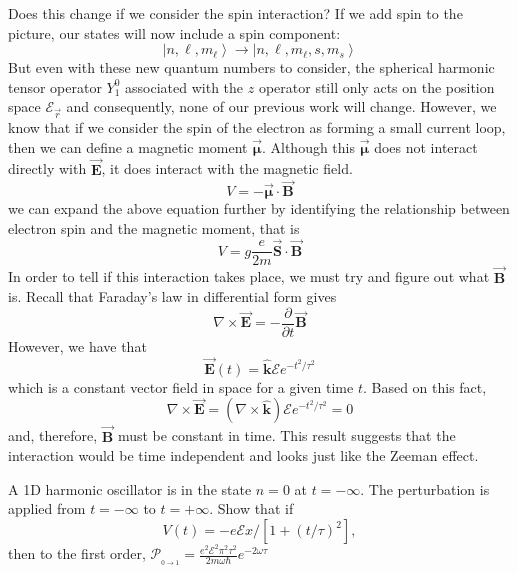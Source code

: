 \documentclass[a4paper, 11pt]{article}
\newcommand{\E}{\mathcal{E}}
\newcommand{\prob}[2]{\mathcal{P}_{_{#1\rightarrow #2}}}
\newcommand{\ket}[1]{\ensuremath{\left|#1\right\rangle}}
\newcommand{\unit}[1]{\hat{\boldsymbol{#1}}}
\newcommand{\bvec}[1]{\vec{\boldsymbol{#1}}}
\newenvironment{solution}{%
	\begin{list}{}{%
			\setlength{\topsep}{0pt}%
			\setlength{\leftmargin}{0.5cm}%
			\setlength{\rightmargin}{0.5cm}%
			\setlength{\listparindent}{\parindent}%
			\setlength{\itemindent}{\parindent}%
			\setlength{\parsep}{\parskip}%
		}%
		\item[]}{\end{list}}
\begin{document}
\begin{enumerate}[leftmargin=0em, label=\textbf{\arabic*}]
\begin{solution}
      Does this change if we consider the spin interaction? If we add spin to
      the picture, our states will now include a spin component:
      \begin{equation}
        \ket{n,\ell,m_\ell}\rightarrow \ket{n, \ell, m_\ell,s,m_s}
      \end{equation}
      But even with these new quantum numbers to consider, the spherical
      harmonic tensor operator $Y_1^0$ associated with the $z$ operator still
      only acts on the position space $\E_{\vec{r}}$ and consequently, none of our
      previous work will change. However, we know that if we consider the spin
      of the electron as forming a small current loop, then we can define a
      magnetic moment $\bvec{\mu}$. Although this $\bvec{\mu}$ does not interact
      directly with $\bvec{E}$, it does interact with the magnetic field. 
      \begin{equation}
        V = -\bvec{\mu}\cdot \bvec{B}
      \end{equation}
      we can expand the above equation further by identifying the relationship
      between electron spin and the magnetic moment, that is
      \begin{equation}
        V = g\frac{e}{2m}\bvec{S}\cdot \bvec{B}
      \end{equation}
      In order to tell if this interaction takes place, we must try and figure out
      what $\bvec{B}$ is. Recall that Faraday's law in differential form gives
      \begin{equation}
        \nabla\times\bvec{E} = -\frac{\partial}{\partial t}\bvec{B}  
      \end{equation}
      However, we have that
      \begin{equation}
        \bvec{E}(t) = \unit{k}\E e^{-t^2/\tau^2}
      \end{equation}
      which is a constant vector field in space for a given time $t$. Based on
      this fact,
      \begin{equation}
        \nabla\times\bvec{E} = (\nabla\times\unit{k})\E e^{-t^2/\tau^2} = 0
      \end{equation}
      and, therefore, $\bvec{B}$ must be constant in time. This result suggests
      that the interaction would be time independent and looks just like the
      Zeeman effect. 
    \end{solution}
    
   \item A 1D harmonic oscillator is in the state $n=0$ at $t=-\infty$. The
     perturbation is applied from $t=-\infty$ to $t=+\infty$. Show that if
     \begin{equation}
       V(t) = -e\E x/\left[ 1+(t/\tau)^2 \right],
     \end{equation}
    then to the first order,
    $\prob{0}{1}=\frac{e^2\E^2\pi^2\tau^2}{2m\omega\hbar}e^{-2\omega\tau}$


\end{enumerate}
\end{document}
